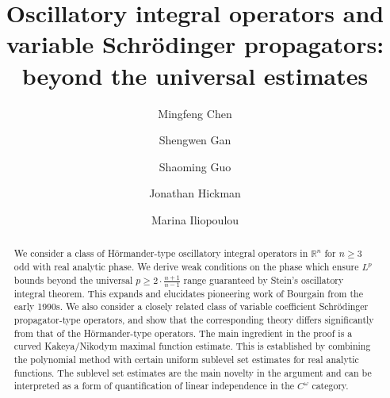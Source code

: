 \documentclass[reqno]{amsart}
\numberwithin{equation}{section}
\newcommand{\R}{\mathbb{R}}
\theoremstyle{plain}
\theoremstyle{definition}
\begin{document}
\title[Oscillatory integral operators and variable propagators]{Oscillatory integral operators and variable Schr\"odinger propagators: beyond the universal estimates}

\date{}

\begin{abstract} We consider a class of H\"ormander-type oscillatory integral operators in $\R^n$ for $n \geq 3$ odd with real analytic phase. We derive weak conditions on the phase which ensure $L^p$ bounds beyond the universal $p \geq 2 \cdot \frac{n+1}{n-1}$ range guaranteed by Stein's oscillatory integral theorem. This expands and elucidates pioneering work of Bourgain from the early 1990s. We also consider a closely related class of variable coefficient Schr\"odinger propagator-type operators, and show that the corresponding theory differs significantly from that of the H\"ormander-type operators. The main ingredient in the proof is a curved Kakeya/Nikodym maximal function estimate. This is established by combining the polynomial method with certain uniform sublevel set estimates for real analytic functions. The sublevel set estimates are the main novelty in the argument and can be interpreted as a form of quantification of linear independence in the $C^{\omega}$ category. 
\end{abstract}

\author[M. Chen]{Mingfeng Chen}
\address{Mingfeng Chen: Department of Mathematics, University of Wisconsin-Madison, Madison, WI 53706, USA.}

\author[S. Gan]{Shengwen Gan}
\address{Shengwen Gan: Department of Mathematics, University of Wisconsin-Madison, Madison, WI 53706, USA.}

\author[S. Guo]{Shaoming Guo}
\address{Shaoming Guo: Chern Institute of Mathematics and LPMC, Nankai University, Tianjin, China\\
and \\
Department of Mathematics, University of Wisconsin-Madison, Madison, WI-53706, USA}

\author[J. Hickman]{Jonathan Hickman}
\address{Jonathan Hickman: School of Mathematics and Maxwell Institute for Mathematical Sciences, James Clerk Maxwell Building, The King's Buildings, Peter Guthrie Tait Road, Edinburgh, EH9 3FD, UK.}

\author[M. Iliopoulou]{Marina Iliopoulou}
\address{Marina Iliopoulou: Department of Mathematics, National and Kapodistrian University of Athens, Panepistimioupolis, Zografou 157 84, Greece.}
\end{document}

